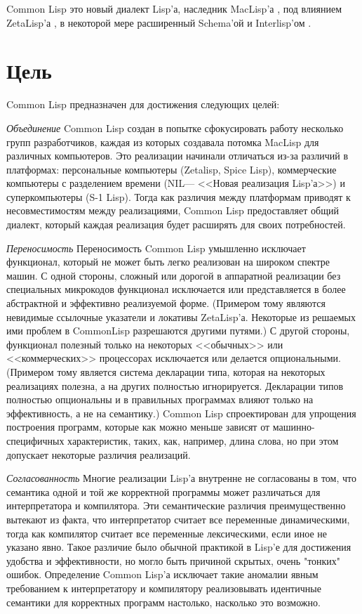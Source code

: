 Common Lisp это новый диалект Lisp'а, наследник
MacLisp'а \cite{MOONUAL,PITMANUAL}, под влиянием
ZetaLisp'а \cite{BLUE-LISPM,GREEN-LISPM}, в некоторой мере расширенный Schema'ой
\cite{SCHEME-REVISED-REPORT} и Interlisp'ом \cite{INTERLISP}. 

\section{Цель}

Common Lisp предназначен для достижения следующих целей: 

\begin{flushdesc}
\item[\emph{Объединение}]
Common Lisp создан в попытке сфокусировать работу несколько групп
разработчиков, каждая из которых создавала потомка MacLisp для
различных компьютеров. Это реализации начинали отличаться из-за различий в
платформах: персональные компьютеры (Zetalisp, 
Spice Lisp), коммерческие компьютеры с разделением времени
(NIL--- <<Новая реализация Lisp'а>>) и суперкомпьютеры (S-1
Lisp). Тогда как различия между платформам приводят к несовместимостям
между реализациями, Common Lisp предоставляет общий диалект,
который каждая реализация будет расширять для своих потребностей.

\item[\emph{Переносимость}]
Переносимость
Common Lisp умышленно исключает функционал, который не может быть легко
реализован на  широком  спектре  машин. С одной
стороны, сложный или дорогой в аппаратной реализации без специальных
микрокодов функционал исключается или
представляется в более абстрактной и эффективно реализуемой форме.
(Примером тому являются невидимые ссылочные указатели и локативы ZetaLisp'а.
Некоторые из решаемых ими проблем в CommonLisp разрешаются другими путями.)
С другой стороны, функционал полезный только на некоторых <<обычных>> или
<<коммерческих>> процессорах исключается или делается опциональными. (Примером
тому является система декларации типа, которая на некоторых реализациях
полезна, а на других полностью игнорируется. Декларации типов полностью
опциональны и в правильных программах влияют только на эффективность, а не на
семантику.) Common Lisp спроектирован для упрощения построения программ,
которые как можно меньше зависят от машинно-специфичных характеристик, таких,
как, например, длина слова, но при этом допускает некоторые различия реализаций.

\item[\emph{Согласованность}]
Многие реализации Lisp'а внутренне не согласованы в том, что семантика одной и
той же корректной программы может различаться для интерпретатора и
компилятора. Эти семантические различия преимущественно вытекают
из факта, что интерпретатор считает все переменные динамическими, тогда как
компилятор считает все переменные лексическими, если иное не указано явно. Такое
различие было обычной практикой в Lisp'е для 
достижения удобства и эффективности, но могло быть причиной скрытых, очень
"тонких" ошибок. Определение Common Lisp'а исключает такие аномалии явным
требованием к интерпретатору и компилятору реализовывать
идентичные семантики для корректных программ настолько, насколько
это возможно.


\end{flushdesc}

